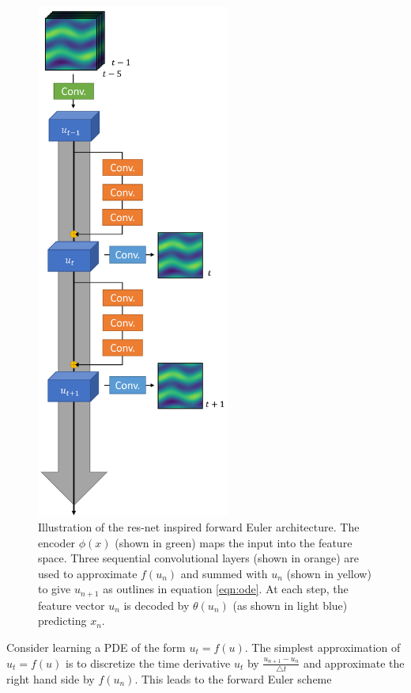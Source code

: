 \documentclass[12pt]{article}
\theoremstyle{plain}
\theoremstyle{remark}
\theoremstyle{definition}
\begin{document}
\begin{figure}
	\centering
	\begin{minipage}[c]{\textwidth}
		\centering
		\includegraphics[width=2.5in]{pde_arch}
		\caption{Illustration of the res-net inspired forward Euler architecture. The encoder $\phi(x)$ (shown in green) maps the input into the feature space. Three sequential convolutional layers (shown in orange) are used to approximate $f(u_n)$ and summed with $u_n$ (shown in yellow) to give $u_{n+1}$ as outlines in equation \ref{eqn:ode}. At each step, the feature vector $u_n$ is decoded by $\theta(u_n)$ (as shown in light blue) predicting $x_n$. }
		\label{fig:pdearch}
	\end{minipage}
\end{figure}


Consider learning a PDE of the form $u_t = f(u)$. The simplest approximation of $u_t = f(u)$ is to discretize the time derivative $u_t$ by $\frac{u_{n+1} - u_n}{\bigtriangleup t}$ and approximate the right hand side by $f(u_n)$. This leads to the forward Euler scheme  
\end{document}
